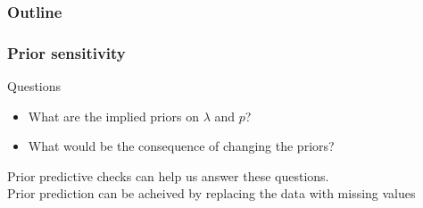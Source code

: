 \documentclass[color=usenames,dvipsnames]{beamer}\usepackage[]{graphicx}\usepackage[]{color}
\begin{document}
\begin{frame}[plain]
  \frametitle{Outline}
  \Large
\end{frame}






\begin{frame}
  \frametitle{Prior sensitivity}
  Questions
  \begin{itemize}
    \item What are the implied priors on $\lambda$ and $p$?
    \item What would be the consequence of changing the priors?
  \end{itemize}
  \pause
  \vfill
  \alert{Prior predictive checks} can help us answer these questions. \\
  \pause
  \vfill
  Prior prediction can be acheived by replacing the data with missing values \\
\end{frame}
\end{document}
